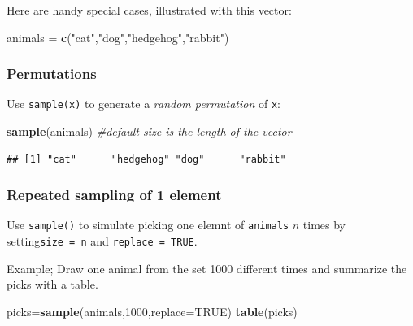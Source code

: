 \documentclass[
]{book}
\newenvironment{Shaded}{\begin{snugshade}}{\end{snugshade}}
\newcommand{\AttributeTok}[1]{\textcolor[rgb]{0.13,0.29,0.53}{#1}}
\newcommand{\CommentTok}[1]{\textcolor[rgb]{0.56,0.35,0.01}{\textit{#1}}}
\newcommand{\ConstantTok}[1]{\textcolor[rgb]{0.56,0.35,0.01}{#1}}
\newcommand{\DecValTok}[1]{\textcolor[rgb]{0.00,0.00,0.81}{#1}}
\newcommand{\FunctionTok}[1]{\textcolor[rgb]{0.13,0.29,0.53}{\textbf{#1}}}
\newcommand{\NormalTok}[1]{#1}
\newcommand{\OtherTok}[1]{\textcolor[rgb]{0.56,0.35,0.01}{#1}}
\newcommand{\StringTok}[1]{\textcolor[rgb]{0.31,0.60,0.02}{#1}}
\theoremstyle{definition}
\theoremstyle{definition}
\theoremstyle{definition}
\theoremstyle{definition}
\theoremstyle{remark}
\begin{document}
Here are handy special cases, illustrated with this vector:

\begin{Shaded}
\begin{Highlighting}[]
\NormalTok{animals }\OtherTok{=} \FunctionTok{c}\NormalTok{(}\StringTok{"cat"}\NormalTok{,}\StringTok{"dog"}\NormalTok{,}\StringTok{"hedgehog"}\NormalTok{,}\StringTok{"rabbit"}\NormalTok{)}
\end{Highlighting}
\end{Shaded}

\subsubsection*{Permutations}\label{permutations-1}

Use \texttt{sample(x)} to generate a \emph{random permutation} of \texttt{x}:

\begin{Shaded}
\begin{Highlighting}[]
\FunctionTok{sample}\NormalTok{(animals) }\CommentTok{\#default size is the length of the vector}
\end{Highlighting}
\end{Shaded}

\begin{verbatim}
## [1] "cat"      "hedgehog" "dog"      "rabbit"
\end{verbatim}

\subsubsection*{Repeated sampling of 1 element}\label{repeated-sampling-of-1-element}

Use \texttt{sample()} to simulate picking one elemnt of \texttt{animals} \(n\) times by setting\texttt{size\ =\ n} and \texttt{replace\ =\ TRUE}.

Example; Draw one animal from the set 1000 different times and summarize the picks with a table.

\begin{Shaded}
\begin{Highlighting}[]
\NormalTok{picks}\OtherTok{=}\FunctionTok{sample}\NormalTok{(animals,}\DecValTok{1000}\NormalTok{,}\AttributeTok{replace=}\ConstantTok{TRUE}\NormalTok{) }
\FunctionTok{table}\NormalTok{(picks) }
\end{Highlighting}
\end{Shaded}
\end{document}
